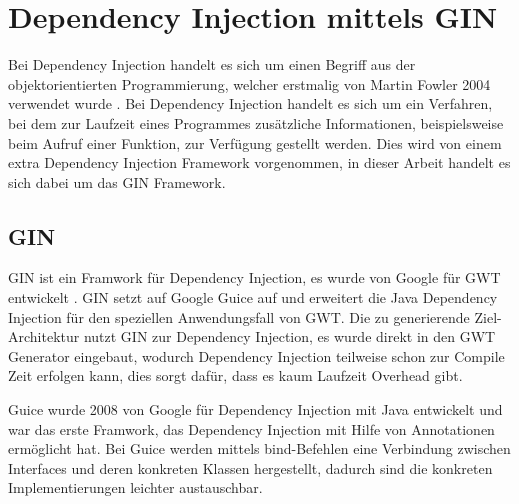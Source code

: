\section{Dependency Injection mittels GIN} \label{GIN}
Bei Dependency Injection handelt es sich um einen Begriff aus der
objektorientierten Programmierung, welcher erstmalig von Martin Fowler 2004
verwendet wurde \cite{bib:DI}. Bei Dependency Injection handelt es sich um
ein Verfahren, bei dem zur Laufzeit eines Programmes zusätzliche Informationen,
beispielsweise beim Aufruf einer Funktion, zur Verfügung gestellt werden. Dies
wird von einem extra Dependency Injection Framework vorgenommen, in dieser
Arbeit handelt es sich dabei um das GIN Framework.

\subsection{GIN}
GIN ist ein Framwork für Dependency Injection, es wurde von Google
für GWT entwickelt \cite[GIN]{bib:gin}. GIN setzt auf Google Guice
\cite[Guice]{bib:guice} auf und erweitert die Java Dependency Injection für den
speziellen Anwendungsfall von GWT. Die zu generierende Ziel-Architektur nutzt
GIN zur Dependency Injection, es wurde direkt in den GWT Generator eingebaut,
wodurch Dependency Injection teilweise schon zur Compile Zeit erfolgen kann,
dies sorgt dafür, dass es kaum Laufzeit Overhead gibt.

Guice wurde 2008 von Google für Dependency Injection mit Java entwickelt und war
das erste Framwork, das Dependency Injection mit Hilfe von Annotationen
ermöglicht hat. Bei Guice werden mittels bind-Befehlen eine Verbindung zwischen
Interfaces und deren konkreten Klassen hergestellt, dadurch sind die konkreten
Implementierungen leichter austauschbar.

